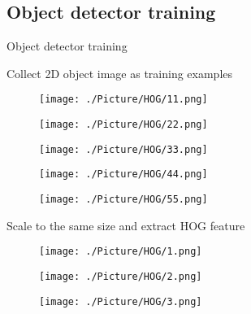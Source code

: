 \documentclass[xcolor=table,compress,blue]{beamer}
\begin{document}
\subsection{Object detector training}
\begin{frame}{Object detector training}
	\vspace{-28pt}
	\begin{exampleblock}{Collect 2D object image as training examples}
		\begin{figure}[htpb]
			\centering
			\begin{minipage}[b]{0.8in}
				\centerline{\texttt{[image: ./Picture/HOG/11.png]}}
			\end{minipage}
			\begin{minipage}[b]{0.8in}
				\centerline{\texttt{[image: ./Picture/HOG/22.png]}}
			\end{minipage}
			\begin{minipage}[b]{0.8in}
				\centerline{\texttt{[image: ./Picture/HOG/33.png]}}
			\end{minipage}
			\begin{minipage}[b]{0.8in}
				\centerline{\texttt{[image: ./Picture/HOG/44.png]}}
			\end{minipage}
			\begin{minipage}[b]{0.8in}
				\centerline{\texttt{[image: ./Picture/HOG/55.png]}}
			\end{minipage}
			\label{fig:Models} %
		\end{figure}
	\end{exampleblock}
	\vspace{-16pt}
	\begin{exampleblock}{Scale to the same size and extract HOG feature}
		\begin{figure}[htpb]
			\centering
			\begin{minipage}[b]{0.8in}
				\centerline{\texttt{[image: ./Picture/HOG/1.png]}}
			\end{minipage}
			\begin{minipage}[b]{0.8in}
				\centerline{\texttt{[image: ./Picture/HOG/2.png]}}
			\end{minipage}
			\begin{minipage}[b]{0.8in}
				\centerline{\texttt{[image: ./Picture/HOG/3.png]}}
			\end{minipage}

\end{figure}
\end{exampleblock}
\end{frame}
\end{document}
